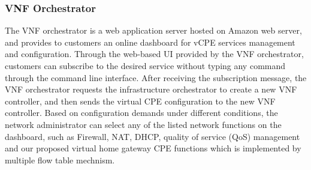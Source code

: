 \subsubsection{VNF Orchestrator}
The VNF orchestrator is a web application server hosted on Amazon web server, and provides to customers an online dashboard for vCPE services management and configuration. Through the web-based UI provided by the VNF orchestrator, customers can subscribe to the desired service without typing any command through the command line interface. After receiving the subscription message, the VNF orchestrator requests the infrastructure orchestrator to create a new VNF controller, and then sends the virtual CPE configuration to the new VNF controller. Based on configuration demands under different conditions, the network administrator can select any of the listed network functions on the dashboard, such as Firewall, NAT, DHCP, quality of service (QoS) management and our proposed virtual home gateway CPE functions which is implemented by multiple flow table mechnism.

